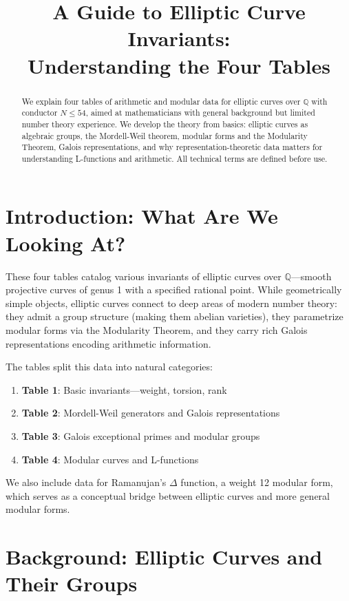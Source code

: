 \documentclass[11pt]{article}
\title{A Guide to Elliptic Curve Invariants:\\Understanding the Four Tables}
\author{}
\date{}
\begin{document}
\maketitle

\begin{abstract}
We explain four tables of arithmetic and modular data for elliptic curves over $\mathbb{Q}$ with conductor $N \leq 54$, aimed at mathematicians with general background but limited number theory experience. We develop the theory from basics: elliptic curves as algebraic groups, the Mordell-Weil theorem, modular forms and the Modularity Theorem, Galois representations, and why representation-theoretic data matters for understanding L-functions and arithmetic. All technical terms are defined before use.
\end{abstract}

\tableofcontents
\clearpage

\section{Introduction: What Are We Looking At?}

These four tables catalog various invariants of elliptic curves over $\mathbb{Q}$---smooth projective curves of genus 1 with a specified rational point. While geometrically simple objects, elliptic curves connect to deep areas of modern number theory: they admit a group structure (making them abelian varieties), they parametrize modular forms via the Modularity Theorem, and they carry rich Galois representations encoding arithmetic information.

The tables split this data into natural categories:
\begin{enumerate}
\item \textbf{Table 1}: Basic invariants---weight, torsion, rank
\item \textbf{Table 2}: Mordell-Weil generators and Galois representations
\item \textbf{Table 3}: Galois exceptional primes and modular groups
\item \textbf{Table 4}: Modular curves and L-functions
\end{enumerate}

We also include data for Ramanujan's $\Delta$ function, a weight 12 modular form, which serves as a conceptual bridge between elliptic curves and more general modular forms.

\section{Background: Elliptic Curves and Their Groups}
\end{document}
